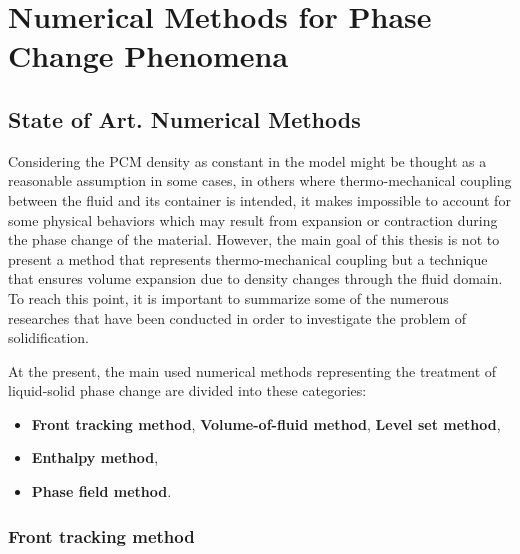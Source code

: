 
\chapter{Numerical Methods for Phase Change Phenomena} %

\label{Chapter2} %


\section{State of Art. Numerical Methods} %
\setlength{\parindent}{0.5cm} Considering the PCM density as constant in the model might be thought as a reasonable assumption in some cases, in others where thermo-mechanical coupling between the fluid and its container is intended, it makes impossible to account for some physical behaviors which may result from expansion or contraction during the phase change of the material. However, the main goal of this thesis is not to present a method that represents thermo-mechanical coupling but a technique that ensures volume expansion due to density changes through the fluid domain.
To reach this point, it is important to summarize some of the numerous researches that have been conducted in order to investigate the problem of solidification. 

\noindent At the present, the main used numerical methods representing the treatment of liquid-solid phase change are divided into these categories:
\begin{itemize}
	\item \textbf{Front tracking method},
	\subitem \textbf{Volume-of-fluid method},
	\subitem \textbf{Level set method},
	\item \textbf{Enthalpy method},
	\item \textbf{Phase field method}.
\end{itemize}

\subsection{Front tracking method}

